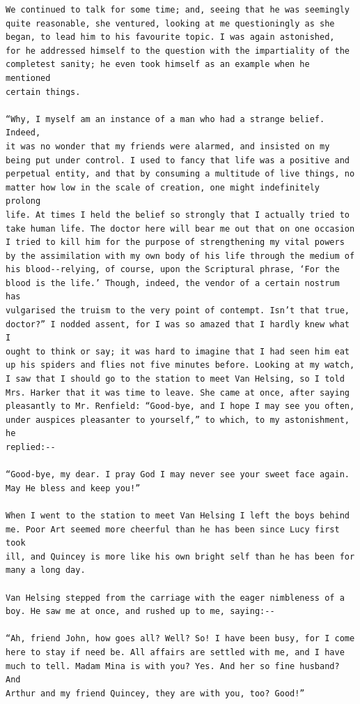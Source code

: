 \documentclass{article}
\begin{document}
\begin{verbatim}
We continued to talk for some time; and, seeing that he was seemingly
quite reasonable, she ventured, looking at me questioningly as she
began, to lead him to his favourite topic. I was again astonished,
for he addressed himself to the question with the impartiality of the
completest sanity; he even took himself as an example when he mentioned
certain things.

“Why, I myself am an instance of a man who had a strange belief. Indeed,
it was no wonder that my friends were alarmed, and insisted on my
being put under control. I used to fancy that life was a positive and
perpetual entity, and that by consuming a multitude of live things, no
matter how low in the scale of creation, one might indefinitely prolong
life. At times I held the belief so strongly that I actually tried to
take human life. The doctor here will bear me out that on one occasion
I tried to kill him for the purpose of strengthening my vital powers
by the assimilation with my own body of his life through the medium of
his blood--relying, of course, upon the Scriptural phrase, ‘For the
blood is the life.’ Though, indeed, the vendor of a certain nostrum has
vulgarised the truism to the very point of contempt. Isn’t that true,
doctor?” I nodded assent, for I was so amazed that I hardly knew what I
ought to think or say; it was hard to imagine that I had seen him eat
up his spiders and flies not five minutes before. Looking at my watch,
I saw that I should go to the station to meet Van Helsing, so I told
Mrs. Harker that it was time to leave. She came at once, after saying
pleasantly to Mr. Renfield: “Good-bye, and I hope I may see you often,
under auspices pleasanter to yourself,” to which, to my astonishment, he
replied:--

“Good-bye, my dear. I pray God I may never see your sweet face again.
May He bless and keep you!”

When I went to the station to meet Van Helsing I left the boys behind
me. Poor Art seemed more cheerful than he has been since Lucy first took
ill, and Quincey is more like his own bright self than he has been for
many a long day.

Van Helsing stepped from the carriage with the eager nimbleness of a
boy. He saw me at once, and rushed up to me, saying:--

“Ah, friend John, how goes all? Well? So! I have been busy, for I come
here to stay if need be. All affairs are settled with me, and I have
much to tell. Madam Mina is with you? Yes. And her so fine husband? And
Arthur and my friend Quincey, they are with you, too? Good!”


\end{verbatim}
\end{document}
